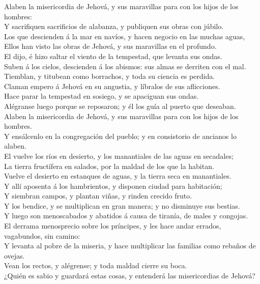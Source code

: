  Alaben la misericordia de Jehová, y sus maravillas para
con los hijos de los hombres:\\
 Y sacrifiquen sacrificios de alabanza, y publiquen sus
obras con júbilo.\\
 Los que descienden á la mar en navíos, y hacen negocio en
las muchas aguas,\\
 Ellos han visto las obras de Jehová, y sus maravillas en
el profundo.\\
 El dijo, é hizo saltar el viento de la tempestad, que
levanta sus ondas.\\
 Suben á los cielos, descienden á los abismos: sus almas se
derriten con el mal.\\
 Tiemblan, y titubean como borrachos, y toda su ciencia es
perdida.\\
 Claman empero á Jehová en su angustia, y líbralos de sus
aflicciones.\\
 Hace parar la tempestad en sosiego, y se apaciguan sus
ondas.\\
 Alégranse luego porque se reposaron; y él los guía al
puerto que deseaban.\\
 Alaben la misericordia de Jehová, y sus maravillas para
con los hijos de los hombres.\\
 Y ensálcenlo en la congregación del pueblo; y en
consistorio de ancianos lo alaben.\\
 El vuelve los ríos en desierto, y los manantiales de las
aguas en secadales;\\
 La tierra fructífera en salados, por la maldad de los que
la habitan.\\
 Vuelve el desierto en estanques de aguas, y la tierra seca
en manantiales.\\
 Y allí aposenta á los hambrientos, y disponen ciudad para
habitación;\\
 Y siembran campos, y plantan viñas, y rinden crecido
fruto.\\
 Y los bendice, y se multiplican en gran manera; y no
disminuye sus bestias.\\
 Y luego son menoscabados y abatidos á causa de tiranía, de
males y congojas.\\
 El derrama menosprecio sobre los príncipes, y les hace
andar errados, vagabundos, sin camino:\\
 Y levanta al pobre de la miseria, y hace multiplicar las
familias como rebaños de ovejas.\\
 Vean los rectos, y alégrense; y toda maldad cierre su
boca.\\
 ¿Quién es sabio y guardará estas cosas, y entenderá las
misericordias de Jehová?

